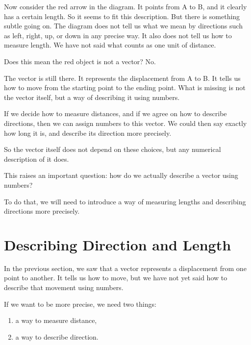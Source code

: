 \documentclass[11pt,openany]{book}
\theoremstyle{definition}
\begin{document}
\medskip

Now consider the red arrow in the diagram. It points from A to B, and it clearly has a certain length.
So it seems to fit this description. But there is something subtle going on. The diagram does not tell us what we mean by directions such as left, right, up, or down in any precise way.
It also does not tell us how to measure length. We have not said what counts as one unit of distance.

\medskip

Does this mean the red object is not a vector? No.

\medskip

The vector is still there. It represents the displacement from A to B. It tells us how to move from the starting point to the ending point. What is missing is not the vector itself, but a way of describing it using numbers.

\medskip

If we decide how to measure distances, and if we agree on how to describe directions,
then we can assign numbers to this vector. We could then say exactly how long it is,
and describe its direction more precisely.

\medskip

So the vector itself does not depend on these choices, but any numerical description of it does.

\medskip

This raises an important question: how do we actually describe a vector using numbers?

\medskip

To do that, we will need to introduce a way of measuring lengths and describing directions more precisely.

\section{Describing Direction and Length}

In the previous section, we saw that a vector represents a displacement from one point to another.
It tells us how to move, but we have not yet said how to describe that movement using numbers.

\medskip

If we want to be more precise, we need two things:

\begin{enumerate}
  \item a way to measure distance,
  \item a way to describe direction.
\end{enumerate}
\end{document}
